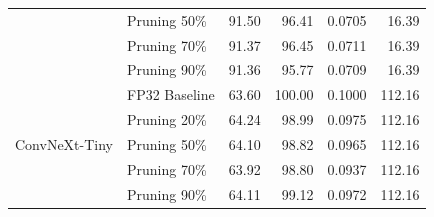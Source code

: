 \begin{table}[htbp]
{\begin{tabular}{llrrrr}
  & Pruning 50\% & 91.50 & 96.41 & 0.0705 & 16.39 \\
  & Pruning 70\% & 91.37 & 96.45 & 0.0711 & 16.39 \\
  & Pruning 90\% & 91.36 & 95.77 & 0.0709 & 16.39 \\
\midrule
\multirow{5}{*}{ConvNeXt-Tiny}
  & FP32 Baseline & 63.60 & 100.00 & 0.1000 & 112.16 \\
  & Pruning 20\% & 64.24 & 98.99 & 0.0975 & 112.16 \\
  & Pruning 50\% & 64.10 & 98.82 & 0.0965 & 112.16 \\
  & Pruning 70\% & 63.92 & 98.80 & 0.0937 & 112.16 \\
  & Pruning 90\% & 64.11 & 99.12 & 0.0972 & 112.16 \\
\bottomrule
\end{tabular}%
}
\end{table}